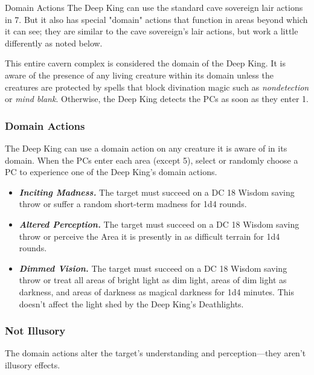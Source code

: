 \documentclass[10pt,a4paper,twoside,bg=print,twocolumn,openany,nodeprecatedcode]{dndbook}
\begin{document}
\begin{DndSidebar}[float=!b]{Domain Actions}
The Deep King can use the standard cave sovereign lair actions in 7. But it also has special "domain" actions that function in areas beyond which it can see; they are similar to the cave sovereign's lair actions, but work a little differently as noted below.



This entire cavern complex is considered the domain of the Deep King. It is aware of the presence of any living creature within its domain unless the creatures are protected by spells that block divination magic such as \textit{nondetection} or \textit{mind blank}. Otherwise, the Deep King detects the PCs as soon as they enter 1.



\subsubsection{Domain Actions}
The Deep King can use a domain action on any creature it is aware of in its domain. When the PCs enter each area (except 5), select or randomly choose a PC to experience one of the Deep King's domain actions.


\begin{itemize}
\item \textbf{\textit{Inciting Madness.}} The target must succeed on a DC 18 Wisdom saving throw or suffer a random short-term madness for 1d4 rounds.
\item \textbf{\textit{Altered Perception.}} The target must succeed on a DC 18 Wisdom saving throw or perceive the Area it is presently in as difficult terrain for 1d4 rounds.
\item \textbf{\textit{Dimmed Vision.}} The target must succeed on a DC 18 Wisdom saving throw or treat all areas of bright light as dim light, areas of dim light as darkness, and areas of darkness as magical darkness for 1d4 minutes. This doesn't affect the light shed by the Deep King's Deathlights.
\end{itemize}



\subsubsection{Not Illusory}
The domain actions alter the target's understanding and perception—they aren't illusory effects.



\end{DndSidebar}
\end{document}
